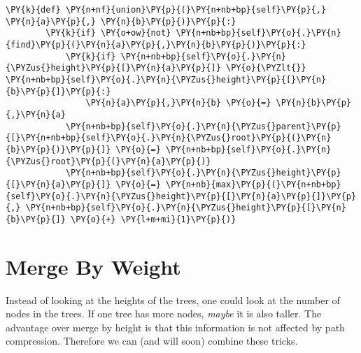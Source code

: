 \begin{Verbatim}[commandchars=\\\{\}]
    \PY{k}{def} \PY{n+nf}{union}\PY{p}{(}\PY{n+nb+bp}{self}\PY{p}{,} \PY{n}{a}\PY{p}{,} \PY{n}{b}\PY{p}{)}\PY{p}{:}
        \PY{k}{if} \PY{o+ow}{not} \PY{n+nb+bp}{self}\PY{o}{.}\PY{n}{find}\PY{p}{(}\PY{n}{a}\PY{p}{,}\PY{n}{b}\PY{p}{)}\PY{p}{:}
            \PY{k}{if} \PY{n+nb+bp}{self}\PY{o}{.}\PY{n}{\PYZus{}height}\PY{p}{[}\PY{n}{a}\PY{p}{]} \PY{o}{\PYZlt{}} \PY{n+nb+bp}{self}\PY{o}{.}\PY{n}{\PYZus{}height}\PY{p}{[}\PY{n}{b}\PY{p}{]}\PY{p}{:}
                \PY{n}{a}\PY{p}{,}\PY{n}{b} \PY{o}{=} \PY{n}{b}\PY{p}{,}\PY{n}{a}
            \PY{n+nb+bp}{self}\PY{o}{.}\PY{n}{\PYZus{}parent}\PY{p}{[}\PY{n+nb+bp}{self}\PY{o}{.}\PY{n}{\PYZus{}root}\PY{p}{(}\PY{n}{b}\PY{p}{)}\PY{p}{]} \PY{o}{=} \PY{n+nb+bp}{self}\PY{o}{.}\PY{n}{\PYZus{}root}\PY{p}{(}\PY{n}{a}\PY{p}{)}
            \PY{n+nb+bp}{self}\PY{o}{.}\PY{n}{\PYZus{}height}\PY{p}{[}\PY{n}{a}\PY{p}{]} \PY{o}{=} \PY{n+nb}{max}\PY{p}{(}\PY{n+nb+bp}{self}\PY{o}{.}\PY{n}{\PYZus{}height}\PY{p}{[}\PY{n}{a}\PY{p}{]}\PY{p}{,} \PY{n+nb+bp}{self}\PY{o}{.}\PY{n}{\PYZus{}height}\PY{p}{[}\PY{n}{b}\PY{p}{]} \PY{o}{+} \PY{l+m+mi}{1}\PY{p}{)}
\end{Verbatim}


\chapter{Merge By Weight}


Instead of looking at the heights of the trees, one could look at the number of nodes in the trees.  If one tree has more nodes, \emph{maybe} it is also taller.  The advantage over merge by height is that this information is not affected by path compression.  Therefore we can (and will soon) combine these tricks.

